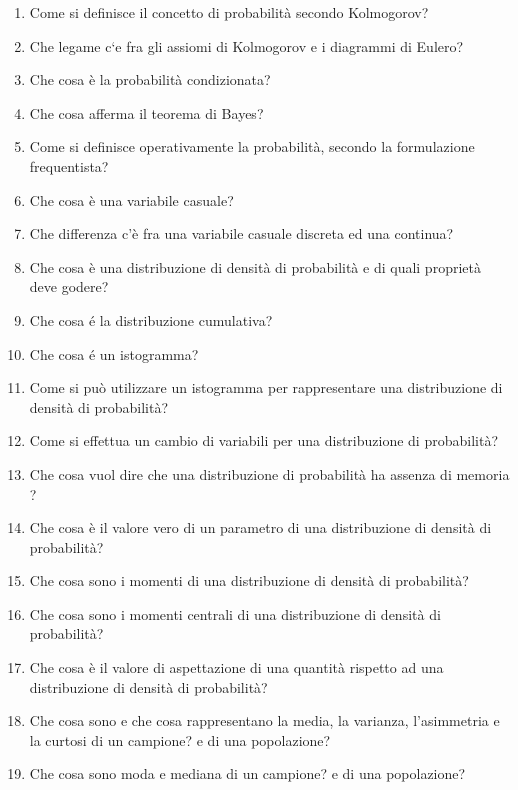 \begin{enumerate}
	\item Come si definisce il concetto di probabilità secondo Kolmogorov?
	\item Che legame c`{e} fra gli assiomi di Kolmogorov e i diagrammi di Eulero?
	\item Che cosa \`{e} la probabilità condizionata?
	\item Che cosa afferma il teorema di Bayes?
	\item Come si definisce operativamente la probabilit\`{a}, secondo la formulazione frequentista? 
	\item Che cosa \`{e} una variabile casuale?
	\item Che differenza c'è fra una variabile casuale discreta ed una continua?
	\item Che cosa \`{e} una distribuzione di densit\`{a} di probabilit\`{a} e di quali propriet\`{a} deve godere?
	\item Che cosa \'{e} la distribuzione cumulativa?
	\item Che cosa \'{e} un istogramma?
	\item Come si pu\`{o} utilizzare un istogramma per rappresentare una distribuzione di densit\`{a} di probabilit\`{a}?
	\item Come si effettua un cambio di variabili per una distribuzione di probabilit\`{a}?
	\item Che cosa vuol dire che una distribuzione di probabilit\`{a} ha assenza di memoria ?
	\item Che cosa \`{e} il valore vero di un parametro di una distribuzione di densit\`{a} di probabilit\`{a}?
	\item Che cosa sono i momenti di una distribuzione di densit\`{a} di probabilit\`{a}?
	\item Che cosa sono i momenti centrali di una distribuzione di densit\`{a} di probabilit\`{a}?
	\item Che cosa è il valore di aspettazione di una quantit\`{a} rispetto ad una distribuzione di densit\`{a} di probabilit\`{a}?
	\item Che cosa sono e che cosa rappresentano la media, la varianza, l'asimmetria e la curtosi di un campione? e di una popolazione?
	\item Che cosa sono moda e mediana di un campione? e di una popolazione?


\end{enumerate}

